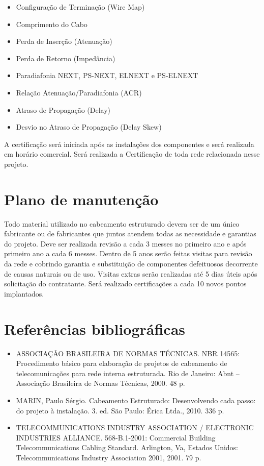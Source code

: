 \documentclass[	DIV=calc,%
							paper=a4,%
							fontsize=12pt,%
							onecolumn]{scrartcl}	 					%
\begin{document}
\begin{itemize}
\item Configuração de Terminação (Wire Map)
\item Comprimento do Cabo
\item Perda de Inserção (Atenuação)
\item Perda de Retorno (Impedância)
\item Paradiafonia NEXT, PS-NEXT, ELNEXT e PS-ELNEXT
\item Relação Atenuação/Paradiafonia (ACR)
\item Atraso de Propagação (Delay)
\item Desvio no Atraso de Propagação (Delay Skew)	
\end{itemize}

A certificação será iniciada após as instalações dos componentes e será realizada em horário comercial. Será realizada a Certificação de toda rede relacionada nesse projeto. 


\section{Plano de manutenção}
Todo material utilizado no cabeamento estruturado devera ser de um único fabricante ou de fabricantes que juntos atendem todas as necessidade e garantias do projeto.  
Deve ser realizada revisão a cada 3 messes no primeiro ano e após primeiro ano a cada 6 messes. 
Dentro de 5 anos serão feitas visitas para revisão da rede e cobrindo garantia e substituição de componentes defeituosos decorrente de causas naturais ou de uso. Visitas extras serão realizadas até 5 dias úteis após solicitação do contratante.  Será realizado certificações a cada 10 novos pontos implantados. 


\section{Referências bibliográficas}
\begin{itemize}
\item ASSOCIAÇÃO BRASILEIRA DE NORMAS TÉCNICAS. NBR 14565: Procedimento básico para elaboração de projetos de cabeamento de telecomunicações para rede interna estruturada. Rio de Janeiro: Abnt – Associação Brasileira de Normas Técnicas, 2000. 48 p.

\item MARIN, Paulo Sérgio. Cabeamento Estruturado: Desenvolvendo cada passo: do projeto à instalação. 3. ed. São Paulo: Érica Ltda., 2010. 336 p.

\item TELECOMMUNICATIONS INDUSTRY ASSOCIATION / ELECTRONIC INDUSTRIES ALLIANCE. 568-B.1-2001: Commercial Building Telecommunications Cabling Standard. Arlington, Va, Estados Unidos: Telecommunications Industry Association 2001, 2001. 79 p.

\end{itemize}
\end{document}
